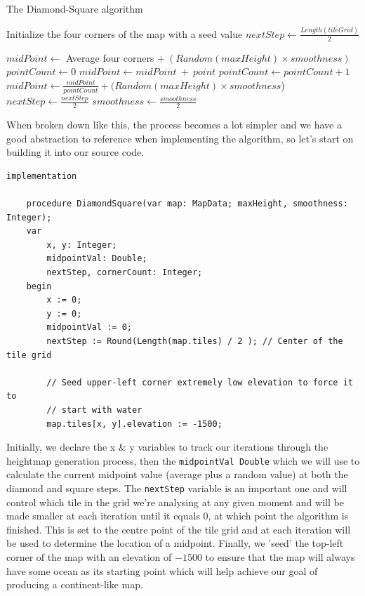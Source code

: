 \documentclass{article}
\begin{document}
\begin{algorithm}[H]
\caption{The Diamond-Square algorithm}
\begin{algorithmic}
	\State Initialize the four corners of the map with a seed value
	\State $nextStep \gets \frac{Length(tileGrid)}{2}$
	
		  
			\State $midPoint \gets$ Average four corners $+ \ (Random(maxHeight) \times smoothness)$
		\EndFor
		 
				\State $pointCount \gets 0$
					\State $midPoint \gets midPoint \ + \ point$
					\State $pointCount\gets pointCount+1$
				\EndIf
			\EndFor
			\State $midPoint \gets \frac{midPoint}{pointCount} + (Random(maxHeight) \times smoothness$)
		\EndFor
		\State $nextStep \gets \frac{nextStep}{2}$ 
		\State $smoothness \gets \frac{smoothness}{2}$ 
	\EndWhile
	
\EndProcedure	
\end{algorithmic}
\end{algorithm}

When broken down like this, the process becomes a lot simpler and we have a good abstraction to reference when implementing the algorithm, so let's start on building it into our source code.

\begin{verbatim}
implementation

	procedure DiamondSquare(var map: MapData; maxHeight, smoothness: Integer);
	var
		x, y: Integer;
		midpointVal: Double;
		nextStep, cornerCount: Integer;
	begin
		x := 0;
		y := 0;
		midpointVal := 0;
		nextStep := Round(Length(map.tiles) / 2 ); // Center of the tile grid

		// Seed upper-left corner extremely low elevation to force it to
		// start with water
		map.tiles[x, y].elevation := -1500;
\end{verbatim}

Initially, we declare the x \& y variables to track our iterations through the heightmap generation process, then the \texttt{midpointVal Double} which we will use to calculate the current midpoint value (average plus a random value) at both the diamond and square steps. The \texttt{nextStep} variable is an important one and will control which tile in the grid we're analysing at any given moment and will be made smaller at each iteration until it equals 0, at which point the algorithm is finished. This is set to the centre point of the tile grid and at each iteration will be used to determine the location of a midpoint. Finally, we 'seed' the top-left corner of the map with an elevation of $-1500$ to ensure that the map will always have some ocean as its starting point which will help achieve our goal of producing a continent-like map.
\end{document}
